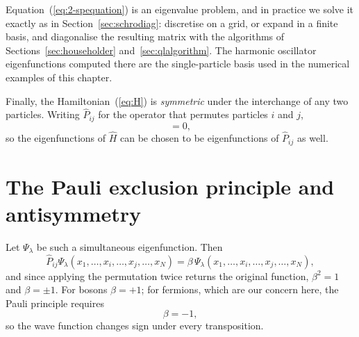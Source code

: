Equation~(\ref{eq:2-spequation}) is an eigenvalue problem, and in practice we
solve it exactly as in Section~\ref{sec:schrodiag}: discretise on a grid, or
expand in a finite basis, and diagonalise the resulting matrix with the
algorithms of Sections~\ref{sec:householder} and~\ref{sec:qlalgorithm}.  The
harmonic oscillator eigenfunctions computed there are the single-particle
basis used in the numerical examples of this chapter.

Finally, the Hamiltonian~(\ref{eq:H}) is \emph{symmetric} under the
interchange of any two particles.  Writing $\hat{P}_{ij}$ for the operator
that permutes particles $i$ and $j$,
\begin{equation}
  [\hat{H},\hat{P}_{ij}] = 0 ,
  \label{eq:2-commuteP}
\end{equation}
so the eigenfunctions of $\hat{H}$ can be chosen to be eigenfunctions of
$\hat{P}_{ij}$ as well.

\section{The Pauli exclusion principle and antisymmetry}
\label{sec:pauli_exc}

Let $\Psi_{\lambda}$ be such a simultaneous eigenfunction.  Then
\begin{equation}
  \hat{P}_{ij}\Psi_{\lambda}(x_1,\dots,x_i,\dots,x_j,\dots,x_N)
   = \beta\,\Psi_{\lambda}(x_1,\dots,x_i,\dots,x_j,\dots,x_N),
  \label{eq:2-permeigen}
\end{equation}
and since applying the permutation twice returns the original function,
$\beta^2=1$ and $\beta=\pm1$.  For bosons $\beta=+1$; for fermions, which are
our concern here, the Pauli principle requires
\begin{equation}
  \beta = -1 ,
  \label{eq:2-beta}
\end{equation}
so the wave function changes sign under every transposition.

